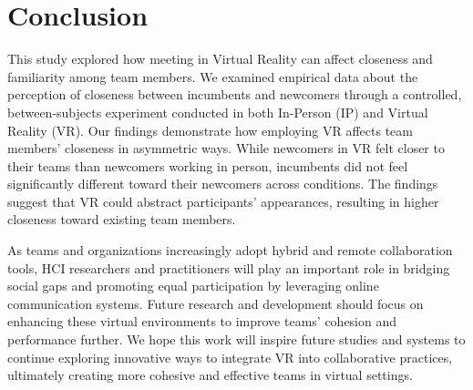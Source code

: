 \section{Conclusion}
\label{conclusion}
This study explored how meeting in Virtual Reality can affect closeness and familiarity among team members. We examined empirical data about the perception of closeness between incumbents and newcomers through a controlled, between-subjects experiment conducted in both In-Person (IP) and Virtual Reality (VR). Our findings demonstrate how employing VR affects team members' closeness in asymmetric ways. While newcomers in VR felt closer to their teams than newcomers working in person, incumbents did not feel significantly different toward their newcomers across conditions. The findings suggest that VR could abstract participants' appearances, resulting in higher closeness toward existing team members. 

As teams and organizations increasingly adopt hybrid and remote collaboration tools, HCI researchers and practitioners will play an important role in bridging social gaps and promoting equal participation by leveraging online communication systems. Future research and development should focus on enhancing these virtual environments to improve teams' cohesion and performance further. We hope this work will inspire future studies and systems to continue exploring innovative ways to integrate VR into collaborative practices, ultimately creating more cohesive and effective teams in virtual settings.

